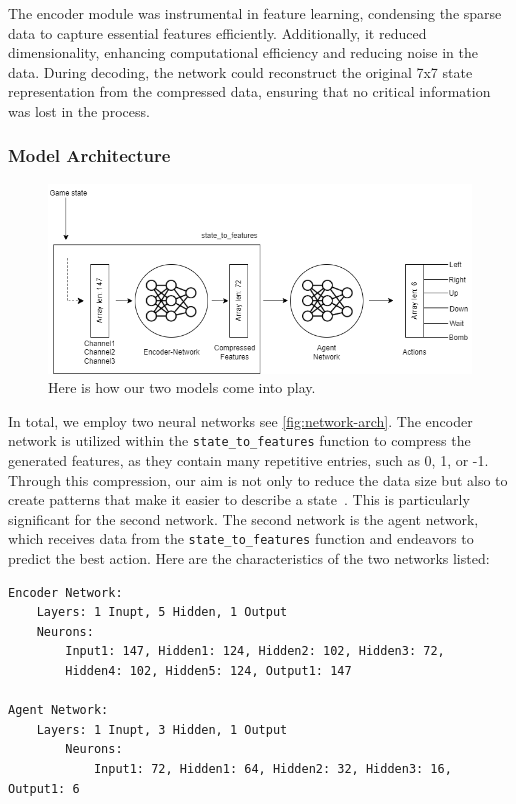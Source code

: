 The encoder module was instrumental in feature learning, condensing the sparse data to capture essential features efficiently. 
Additionally, it reduced dimensionality, enhancing computational efficiency and reducing noise in the data. During decoding, the network could 
reconstruct the original 7x7 state representation from the compressed data, ensuring that no critical information was lost in the process.

\subsubsection*{Model Architecture}

\begin{figure}[H]
    \centering
    
    \includegraphics[width=\oneImgWidth]{images/network-arch}%
    
    \captionadjust%
    \caption{\label{fig:network-arch} Here is how our two models come into play.
    }%
\end{figure}

In total, we employ two neural networks see \autoref{fig:network-arch}. The encoder network is utilized within the \verb|state_to_features| function to compress the 
generated features, as they contain many repetitive entries, such as 0, 1, or -1. Through this compression, our aim is not only to reduce 
the data size but also to create patterns that make it easier to describe a state~\cite{Onl:autoencoder}. This is particularly significant for the second network. 
The second network is the agent network, which receives data from the \verb|state_to_features| function and endeavors to predict the best action.
Here are the characteristics of the two networks listed:

\begin{verbatim}
Encoder Network:
    Layers: 1 Inupt, 5 Hidden, 1 Output
    Neurons: 
        Input1: 147, Hidden1: 124, Hidden2: 102, Hidden3: 72,
        Hidden4: 102, Hidden5: 124, Output1: 147

Agent Network:
    Layers: 1 Inupt, 3 Hidden, 1 Output
        Neurons: 
            Input1: 72, Hidden1: 64, Hidden2: 32, Hidden3: 16, Output1: 6
\end{verbatim}

